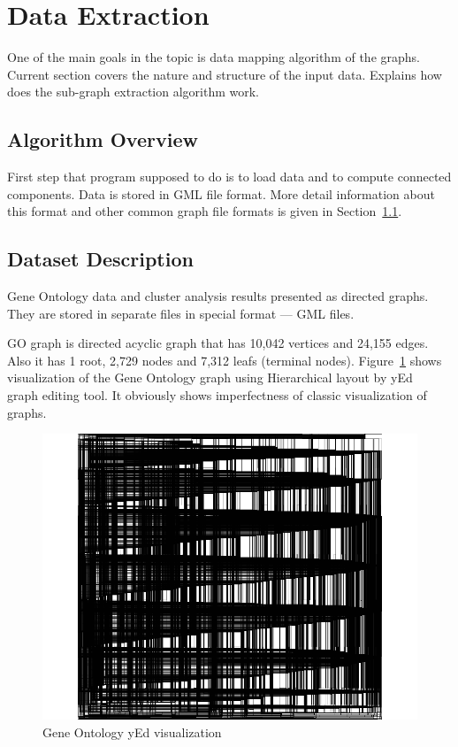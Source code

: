\newpage
\section{Data Extraction}

One of the main goals in the topic is data mapping algorithm of the graphs. Current section covers the nature and structure of the input data. Explains how does the sub-graph extraction algorithm work.

\subsection{Algorithm Overview}
\label{sec:algorithm}
First step that program supposed to do is to load data and to compute connected components. Data is stored in GML file format. More detail information about this format and other common graph file formats is given in Section~\ref{sec:algorithm}.

\subsection{Dataset Description}
\label{sec:dataset_description}
Gene Ontology data and cluster analysis results presented as directed graphs. They are stored in separate files in special format --- GML files.


GO graph is directed acyclic graph that has 10,042 vertices and  24,155 edges. Also it has 1 root, 2,729 nodes and 7,312 leafs (terminal nodes).
Figure~\ref{fig:yed_GO_vis} shows visualization of the Gene Ontology graph using Hierarchical layout by yEd~\cite{yed} graph editing tool. It obviously shows imperfectness of classic visualization of graphs.


\begin{figure}[h!]
\centering
\includegraphics[scale=0.3]{pictures/yEd_GO.png}
\caption{Gene Ontology yEd visualization}
\label{fig:yed_GO_vis}
\end{figure}


